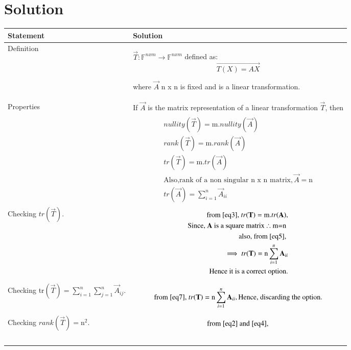 \documentclass[journal,12pt,onecolumn]{IEEEtran}
\begin{document}
\section{Solution}
\begin{longtable}{|p{5cm}|p{13cm}|}
\hline
\textbf{Statement} &\textbf{Solution}\\
\hline
Definition & $\vec{T}:\mathbb{F}^{nxm}\rightarrow \mathbb {F}^{nxm}$ defined as:
\begin{displaymath}\vec{T(X)=AX} \end{displaymath}


where $\vec{A}$ n x n is fixed and is a linear transformation.  \\
\hline
Properties&If $\vec{A}$ is the matrix representation of a linear transformation $\vec{T}$, then\\&
\parbox{12cm}{\begin{align}
nullity(\vec{T})=\text{m}. nullity(\vec{A}) \label{eq1}\\ 
rank(\vec{T})=\text{m}.rank(\vec{A}) \label{eq2}\\
tr(\vec{T})=\text{m}.tr(\vec{A}) \label{eq3}\\
\text{Also,rank of a non singular n x n matrix}, \vec{A}= \text{n} \label{eq4}\\
tr({\vec{A}}) = \sum_{i=1}^n \vec{A}_{ii} \label{eq5}
\end{align}}\\
\hline
Checking $tr$$(\vec{T}).$ &
\parbox{12cm}{\begin{align}
 \text{ from \eqref{eq3}, } tr(\vec{T})=\text{m}.tr(\vec{A}), \\ \text{Since, $\vec{A}$ is a square matrix $\therefore$ m=n }\label{eq6}\\
            \text{also, from \eqref{eq5}, }\\
 \implies tr(\vec{T})   = \text{n}\sum_{i=1}^n \vec{A}_{ii} \label{eq7}\\
           \text{Hence it is a correct option.} \end{align}}\\
\hline
Checking tr$(\vec{T})=\sum_{i=1}^n\sum_{j=1}^n \vec{A}_{ij}.$&
\parbox{12cm}{\begin{align}\text{from \eqref{eq7},}\
    tr(\vec{T})=\text{n}\sum_{i=1}^n \vec{A}_{ii},
    \text{Hence, discarding the option.}\label{eq11}
\end{align}}\\
\hline
 Checking  $rank(\vec{T})=$n$^2$.&
\parbox{12cm}{\begin{align}\text{from \eqref{eq2} and \eqref{eq4},}

\end{align}}$$
\end{longtable}
\end{document}
